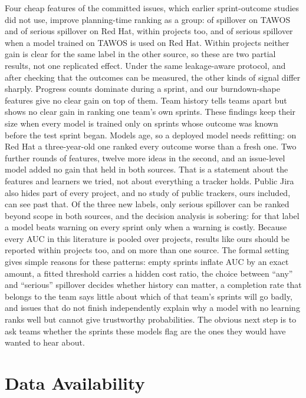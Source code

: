 \documentclass[journal]{IEEEtran}
\begin{document}
Four cheap features of the committed issues, which earlier sprint-outcome studies did not use, improve planning-time ranking as a group: of spillover on TAWOS and of serious spillover on Red Hat, within projects too, and of serious spillover when a model trained on TAWOS is used on Red Hat. Within projects neither gain is clear for the same label in the other source, so these are two partial results, not one replicated effect. Under the same leakage-aware protocol, and after checking that the outcomes can be measured, the other kinds of signal differ sharply. Progress counts dominate during a sprint, and our burndown-shape features give no clear gain on top of them. Team history tells teams apart but shows no clear gain in ranking one team's own sprints. These findings keep their size when every model is trained only on sprints whose outcome was known before the test sprint began. Models age, so a deployed model needs refitting: on Red Hat a three-year-old one ranked every outcome worse than a fresh one. Two further rounds of features, twelve more ideas in the second, and an issue-level model added no gain that held in both sources. That is a statement about the features and learners we tried, not about everything a tracker holds. Public Jira also hides part of every project, and no study of public trackers, ours included, can see past that. Of the three new labels, only serious spillover can be ranked beyond scope in both sources, and the decision analysis is sobering: for that label a model beats warning on every sprint only when a warning is costly. Because every AUC in this literature is pooled over projects, results like ours should be reported within projects too, and on more than one source. The formal setting gives simple reasons for these patterns: empty sprints inflate AUC by an exact amount, a fitted threshold carries a hidden cost ratio, the choice between ``any'' and ``serious'' spillover decides whether history can matter, a completion rate that belongs to the team says little about which of that team's sprints will go badly, and issues that do not finish independently explain why a model with no learning ranks well but cannot give trustworthy probabilities. The obvious next step is to ask teams whether the sprints these models flag are the ones they would have wanted to hear about.

\section*{Data Availability}
\end{document}

